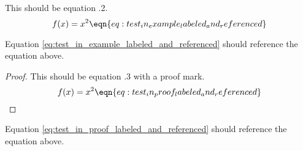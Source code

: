 \begin{example}
    This should be equation \thesubsection.2.
    \[ f(x) = x^2 \eqn{eq:test_in_example_labeled_and_referenced} \]
\end{example}
Equation \eqref{eq:test_in_example_labeled_and_referenced} should reference the equation above.

\begin{proof}
    This should be equation \thesubsection.3 with a proof mark.
    \[ f(x) = x^2 \eqn{eq:test_in_proof_labeled_and_referenced} \]
\end{proof}
Equation \eqref{eq:test_in_proof_labeled_and_referenced} should reference the equation above.
